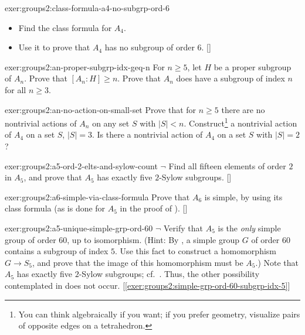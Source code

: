 \begin{exer}{}{exer:groups2:class-formula-a4-no-subgrp-ord-6}
  \exerused{}
  \begin{itemize}
  \item Find the class formula for $A_4$.
  \item Use it to prove that $A_4$ has no subgroup of order $6$.
    []
  \end{itemize}
\end{exer}
\begin{exer}{}{exer:groups2:an-proper-subgrp-idx-geq-n}
  For $n \geq 5$, let $H$ be a proper subgroup of $A_n$. Prove that
  $[A_n : H] \geq n$. Prove that $A_n$ does have a subgroup of index
  $n$ for all $n \geq 3$.
\end{exer}
\begin{exer}{}{exer:groups2:an-no-action-on-small-set}
  Prove that for $n \geq 5$ there are no nontrivial actions of $A_n$
  on any set $S$ with $|S| < n$. Construct\footnote{You can think
    algebraically if you want; if you prefer geometry, visualize pairs
    of opposite edges on a tetrahedron.} a nontrivial action of $A_4$
  on a set $S$, $|S| = 3$. Is there a nontrivial action of $A_4$ on a
  set $S$ with $|S| = 2$?
\end{exer}
\begin{exer}{}{exer:groups2:a5-ord-2-elts-and-sylow-count}
  $\lnot$ Find all fifteen elements of order $2$ in $A_5$, and prove
  that $A_5$ has exactly five $2$-Sylow subgroups.
  []
\end{exer}
\begin{exer}{}{exer:groups2:a6-simple-via-class-formula}
  \exerused{} Prove that $A_6$ is simple, by using its class formula
  (as is done for $A_5$ in the proof of
  ). []
\end{exer}
\begin{exer}{}{exer:groups2:a5-unique-simple-grp-ord-60}
  $\lnot$ Verify that $A_5$ is the \emph{only} simple group of order
  $60$, up to isomorphism. (Hint: By
  , a simple group
  $G$ of order $60$ contains a subgroup of index $5$. Use this fact to
  construct a homomorphism $G \to S_5$, and prove that the image of
  this homomorphism must be $A_5$.) Note that $A_5$ has exactly five
  $2$-Sylow subgroups; cf.\
  . Thus, the other
  possibility contemplated in
   does not
  occur. [\ref{exer:groups2:simple-grp-ord-60-subgrp-idx-5}]
\end{exer}

